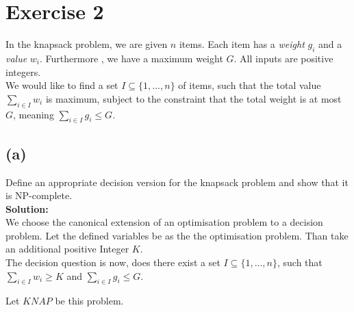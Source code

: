 \section*{Exercise 2}

In the knapsack problem, we are given $n$ items. Each item has a \emph{weight} $g_i$ and a \emph{value} $w_i$.
Furthermore , we have a maximum weight $G$. All inputs are positive integers.\\

We would like to find a set $I \subseteq \{ 1,...,n \}$ of items, such that the total value
$\underset{i \in I}{\sum} w_i$ is maximum, subject to the constraint that the total weight is at most
$G$, meaning $\underset{i \in I}{\sum} g_i \leq G$.

\subsection*{(a)} 

Define an appropriate decision version for the knapsack problem and show that it is NP-complete.\\

\textbf{Solution:}\\
We choose the canonical extension of an optimisation problem to a decision problem. Let the defined variables
be as the the optimisation problem. Than take an additional positive Integer $K$.\\

The decision question is now, does there exist a set $I \subseteq \{ 1, ... , n \}$, such that
$\underset{i \in I}{\sum} w_i \geq K$ and $\underset{ i \in I}{\sum} g_i \leq G$.

Let $KNAP$ be this problem.

